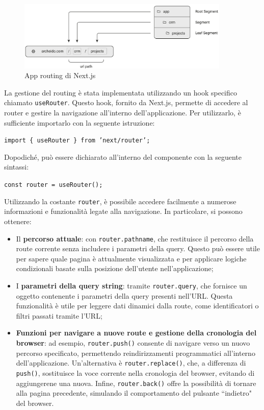 \documentclass[target=bach,aauheader=,style=]{thud}
\begin{document}
\begin{figure}[H]
    \centering
    \includegraphics[width=0.9\textwidth]{img/routing.pdf} 
    \caption{App routing \cite{nextjsdocs2024} di Next.js}
\end{figure}

\noindent La gestione del routing è stata implementata utilizzando un hook specifico chiamato \texttt{useRouter}. Questo hook, fornito da Next.js, permette di accedere al router e gestire la navigazione all'interno dell'applicazione. Per utilizzarlo, è sufficiente importarlo con la seguente istruzione:

\begin{center}
    \texttt{import \{ useRouter \} from 'next/router';}
\end{center}

\noindent Dopodiché, può essere dichiarato all'interno del componente con la seguente sintassi:

\begin{center}
    \texttt{const router = useRouter();}
\end{center}

\noindent Utilizzando la costante \texttt{router}, è possibile accedere facilmente a numerose informazioni e funzionalità legate alla navigazione. In particolare, si possono ottenere:

\begin{itemize} 
    \item Il \textbf{percorso attuale}: con \texttt{router.pathname}, che restituisce il percorso della route corrente senza includere i parametri della query. Questo può essere utile per sapere quale pagina è attualmente visualizzata e per applicare logiche condizionali basate sulla posizione dell'utente nell'applicazione;
    \item I \textbf{parametri della query string}: tramite \texttt{router.query}, che fornisce un oggetto contenente i parametri della query presenti nell'URL. Questa funzionalità è utile per leggere dati dinamici dalla route, come identificatori o filtri passati tramite l'URL;
    \item \textbf{Funzioni per navigare a nuove route e gestione della cronologia del browser}: ad esempio, \texttt{router.push()} consente di navigare verso un nuovo percorso specificato, permettendo reindirizzamenti programmatici all'interno dell'applicazione. Un'alternativa è \texttt{router.replace()}, che, a differenza di \texttt{push()}, sostituisce la voce corrente nella cronologia del browser, evitando di aggiungerene una nuova. Infine, \texttt{router.back()} offre la possibilità di tornare alla pagina precedente, simulando il comportamento del pulsante ``indietro" del browser.
\end{itemize}
\end{document}
